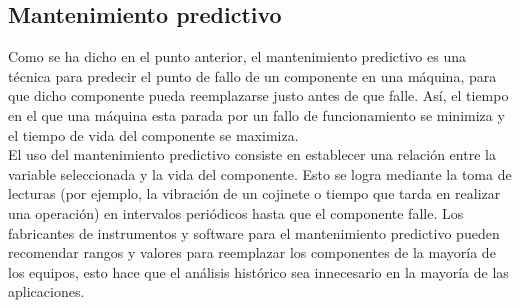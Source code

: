 \documentclass[runningheads,a4paper,12pt]{report}
\begin{document}
\subsection{Mantenimiento predictivo}
Como se ha dicho en el punto anterior, el mantenimiento predictivo es una técnica para predecir el punto de fallo de un componente en una máquina, para que dicho componente pueda reemplazarse justo antes de que falle.  Así, el tiempo en el que una máquina esta parada por un fallo de funcionamiento se minimiza y el tiempo de vida del componente se maximiza. \\

El uso del mantenimiento predictivo consiste en establecer una relación entre la variable seleccionada y la vida del componente. Esto se logra mediante la toma de lecturas (por ejemplo, la vibración de un cojinete o tiempo que tarda en realizar una operación) en intervalos periódicos hasta que el componente falle.  Los fabricantes de instrumentos y software para el mantenimiento predictivo pueden recomendar rangos y valores para reemplazar los componentes de la mayoría de los equipos, esto hace que el análisis histórico sea innecesario en la mayoría de las aplicaciones.  
\end{document}
